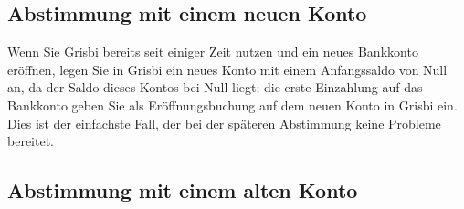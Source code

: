 \subsection{Abstimmung mit einem neuen Konto\label{reconciliation-solve-new}}

Wenn Sie Grisbi bereits seit einiger Zeit nutzen und ein neues Bankkonto eröffnen, legen Sie in Grisbi ein neues Konto mit einem Anfangssaldo von Null an, da der Saldo dieses Kontos bei Null liegt; die erste Einzahlung auf das Bankkonto geben Sie als Eröffnungsbuchung auf dem neuen Konto in Grisbi ein. Dies ist der einfachste Fall, der bei der späteren Abstimmung keine Probleme bereitet.


\subsection{Abstimmung mit einem alten Konto\label{reconciliation-solve-old}}

